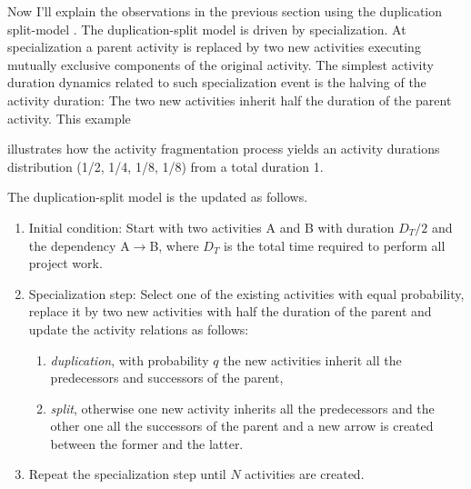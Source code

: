 \documentclass[11pt]{article}
\begin{document}
Now I'll explain the observations in the previous section using the duplication split-model \cite{vazquez23}. The duplication-split model is driven by specialization. At specialization a parent activity is replaced by two new activities executing mutually exclusive components of the original activity. The simplest activity duration dynamics related to such specialization event is the halving of the activity duration: The two new activities inherit half the duration of the parent activity. This example
%
\begin{center}
\label{example}
\end{center}
%
illustrates how the activity fragmentation process yields an activity durations distribution (1/2, 1/4, 1/8, 1/8) from a total duration 1.

The duplication-split model is the updated as follows.
\begin{enumerate}

\item Initial condition: Start with two activities A and B with duration $D_T/2$ and the dependency A$\rightarrow$B, where $D_T$ is the total time required to perform all project work.

\item Specialization step: Select one of the existing activities with equal probability, replace it by two new activities with half the duration of the parent and update the activity relations as follows:
\begin{enumerate}
\item {\em duplication}, with probability $q$ the new activities inherit all the predecessors and successors of the parent,
\item {\em split}, otherwise one new activity inherits all the predecessors and the other one all the successors of the parent  and a new arrow is created between the former and the latter.
\end{enumerate}

\item Repeat the specialization step until $N$ activities are created.

\end{enumerate}
\end{document}
